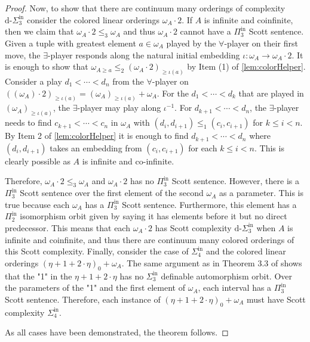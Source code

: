 \documentclass[11pt]{amsart}
\newcommand{\Pinf}[1]{\Pi^{\mathrm{in}}_{#1}}
\newcommand{\Sinf}[1]{\Sigma^{\mathrm{in}}_{#1}}
\theoremstyle{remark}
\begin{document}
\begin{proof}
    Now, to show that there are continuum many orderings of complexity $\text{d-}\Sinf{3}$ consider the colored linear orderings $\omega_A\cdot 2$.
		If $A$ is infinite and coinfinite, then we claim that $\omega_A\cdot 2\leq_3\omega_A$ and thus $\omega_A\cdot 2$ cannot have a $\Pinf{3}$ Scott sentence.
		Given a tuple with greatest element $a \in\omega_A$ played by the $\forall$-player on their first move, the $\exists$-player responds along the natural initial embedding $\iota:\omega_A\to \omega_A\cdot 2$. It is enough to show that $\omega_{A\geq a}\leq_2 (\omega_A\cdot 2)_{\geq \iota(a)}$ by Item (1) of \cref{lem:colorHelper}.
		Consider a play $d_1<\cdots<d_n$ from the $\forall$-player on $((\omega_A)\cdot 2)_{\geq \iota(a)}=(\omega_A)_{\geq \iota(a)}+\omega_A$.
	For the $d_1 <\cdots <d_k$ that are played in $(\omega_{A})_{\geq \iota(a) }$, the $\exists$-player may play along $\iota^{-1}$.
	For $d_{k+1}<\cdots<d_n$, the $\exists$-player needs to find $c_{k+1}<\cdots<c_n$ in $\omega_A$  with $(d_{i},d_{i+1})\leq_1 (c_{i},c_{i+1})$ for $k\leq i<n$. 
    By Item 2 of \cref{lem:colorHelper} it is enough to find $d_{k+1}<\cdots<d_n$ where $(d_{i},d_{i+1})$ takes an embedding from $(c_{i},c_{i+1})$ for each $k\leq i<n$.
    This is clearly possible as $A$ is infinite and co-infinite.


    Therefore, $\omega_A\cdot 2\leq_3\omega_A$ and $\omega_A\cdot 2$ has no $\Pinf{3}$ Scott sentence.
    However, there is a $\Pinf{3}$ Scott sentence over the first element of the second $\omega_A$ as a parameter.
    This is true because each $\omega_A$ has a $\Pinf{3}$ Scott sentence.
    Furthermore, this element has a $\Pinf{2}$ isomorphism orbit given by saying it has elements before it but no direct predecessor.
    This means that each $\omega_A\cdot 2$ has Scott complexity $\text{d-}\Sinf{3}$ when $A$ is infinite and coinfinite, and thus there are continuum many colored orderings of this Scott complexity.
    Finally,  consider the case of $\Sinf{4}$ and the colored linear orderings $(\eta+1+2\cdot\eta)_0+\omega_A.$
    The same argument as in Theorem 3.3 of \cite{GR23} shows that the "1" in the $\eta+1+2\cdot\eta$ has no $\Sinf{3}$ definable automorphism orbit.
    Over the parameters of the "1" and the first element of $\omega_A$, each interval has a $\Pinf{3}$ Scott sentence.
    Therefore, each instance of $(\eta+1+2\cdot\eta)_0+\omega_A$ must have Scott complexity $\Sinf{4}$.

    As all cases have been demonstrated, the theorem follows.
\end{proof}
\end{document}
